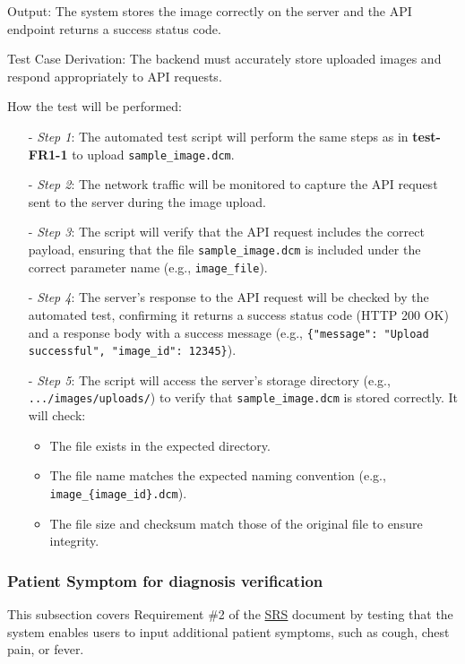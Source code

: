 \documentclass[12pt, titlepage]{article}
\begin{document}
\begin{enumerate}
Output: The system stores the image correctly on the server and the API endpoint returns a success status code.

Test Case Derivation: The backend must accurately store uploaded images and respond appropriately to API requests.

How the test will be performed: 
\begin{itemize}
  \item[-] \textit{Step 1}: The automated test script will perform the same steps as in \textbf{test-FR1-1} to upload \texttt{sample\_image.dcm}.
  \item[-] \textit{Step 2}: The network traffic will be monitored to capture the API request sent to the server during the image upload.
  \item[-] \textit{Step 3}: The script will verify that the API request includes the correct payload, ensuring that the file \texttt{sample\_image.dcm} is included under the correct parameter name (e.g., \texttt{image\_file}).
  \item[-] \textit{Step 4}: The server's response to the API request will be checked by the automated test, confirming it returns a success status code (HTTP 200 OK) and a response body with a success message (e.g., \texttt{\{"message": "Upload successful", "image\_id": 12345\}}).
  \item[-] \textit{Step 5}: The script will access the server's storage directory (e.g., \texttt{.../images/uploads/}) to verify that \texttt{sample\_image.dcm} is stored correctly. It will check:
    \begin{itemize}
      \item The file exists in the expected directory.
      \item The file name matches the expected naming convention (e.g., \texttt{image\_\{image\_id\}.dcm}).
      \item The file size and checksum match those of the original file to ensure integrity.
    \end{itemize}
  \end{itemize}
\end{enumerate}

\subsubsection{Patient Symptom for diagnosis verification }

This subsection covers Requirement \#2 of the \href{https://github.com/RezaJodeiri/CXR-Capstone/blob/main/docs/SRS/SRS.pdf}{SRS} \citep{SRS}
document by testing that the system enables users to input additional patient symptoms, such as cough, chest pain, or fever.
\end{document}
